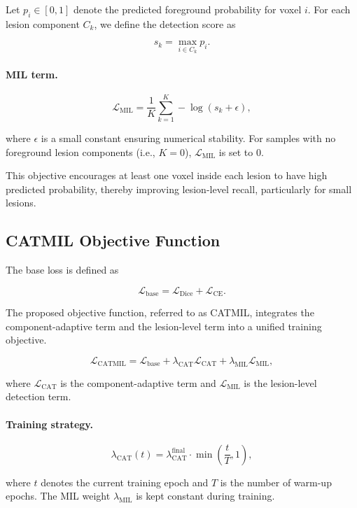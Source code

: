 Let $p_i \in [0,1]$ denote the predicted foreground probability for voxel
$i$. For each lesion component $C_k$, we define the detection score as

\[
s_k = \max_{i \in C_k} p_i .
\]

\paragraph{MIL term.}

\[
\mathcal{L}_{\mathrm{MIL}}
=
\frac{1}{K}
\sum_{k=1}^{K}
-\log \left( s_k + \epsilon \right),
\]

where $\epsilon$ is a small constant ensuring numerical stability.
For samples with no foreground lesion components (i.e., $K = 0$),
$\mathcal{L}_{\mathrm{MIL}}$ is set to $0$.

This objective encourages at least one voxel inside each lesion to have
high predicted probability, thereby improving lesion-level recall,
particularly for small lesions.

\subsection{CATMIL Objective Function}

The base loss is defined as

\[
\mathcal{L}_{\mathrm{base}}
=
\mathcal{L}_{\mathrm{Dice}}
+
\mathcal{L}_{\mathrm{CE}}.
\]

The proposed objective function, referred to as CATMIL, integrates the
component-adaptive term and the lesion-level term into a unified training
objective.

\[
\mathcal{L}_{\mathrm{CATMIL}}
=
\mathcal{L}_{\mathrm{base}}
+
\lambda_{\mathrm{CAT}}
\mathcal{L}_{\mathrm{CAT}}
+
\lambda_{\mathrm{MIL}}
\mathcal{L}_{\mathrm{MIL}},
\]

where $\mathcal{L}_{\mathrm{CAT}}$ is the component-adaptive term and
$\mathcal{L}_{\mathrm{MIL}}$ is the lesion-level detection term.

\paragraph{Training strategy.}

\[
\lambda_{\mathrm{CAT}}(t)
=
\lambda_{\mathrm{CAT}}^{\mathrm{final}}
\cdot
\min\left(\frac{t}{T},1\right),
\]

where $t$ denotes the current training epoch and $T$ is the number of
warm-up epochs. The MIL weight $\lambda_{\mathrm{MIL}}$ is kept constant
during training.